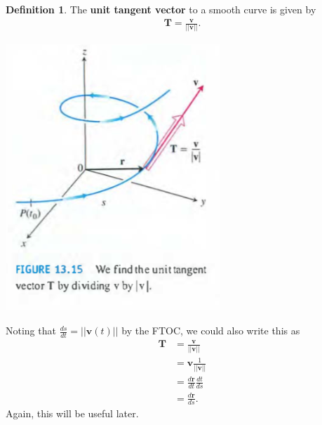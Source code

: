 \documentclass[12pt, letter]{article}
\theoremstyle{plain}
\numberwithin{theorem}{section}
\theoremstyle{definition}
\newtheorem{definition}[theorem]{Definition}
\begin{document}
\bigskip

\hrulefill

\bigskip

\begin{definition}
The \textbf{unit tangent vector} to a smooth curve is given by
\begin{align*}
\bm{T} = \frac{\bm{v}}{||\bm{v}||}.
\end{align*}
\end{definition}

\bigskip

\begin{center}
\includegraphics[scale=0.7]{m1_f28}
\end{center}

\bigskip

Noting that $\frac{ds}{dt} = ||\bm{v}(t)||$ by the FTOC, we could also write this as
\begin{align*}
\bm{T} &= \frac{\bm{v}}{||\bm{v}||}\\
&= \bm{v} \frac{1}{||\bm{v}||}\\
&= \frac{d\bm{r}}{dt} \frac{dt}{ds}\\
&= \frac{d\bm{r}}{ds}.
\end{align*}
Again, this will be useful later.

\bigskip

\hrulefill

\bigskip
\end{document}
